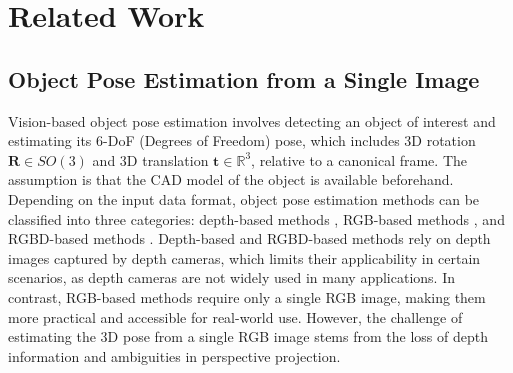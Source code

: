\section{Related Work}
\label{sec:Related}

\subsection{Object Pose Estimation from a Single Image}

Vision-based object pose estimation involves detecting an object of interest and estimating its 6-DoF (Degrees of Freedom) pose, which includes 3D rotation $\mathbf{R} \in SO(3)$ and 3D translation $\mathbf{t} \in \mathbb{R}^3$, relative to a canonical frame. The assumption is that the CAD model of the object is available beforehand. Depending on the input data format, object pose estimation methods can be classified into three categories: depth-based methods \cite{wang20216d, gao20206d, guo2021efficient}, RGB-based methods \cite{billings2019silhonet, peng2019pvnet, wang2021gdr}, and RGBD-based methods \cite{wang2019densefusion, he2020pvn3d, hong2024rdpn6d}. Depth-based and RGBD-based methods rely on depth images captured by depth cameras, which limits their applicability in certain scenarios, as depth cameras are not widely used in many applications. In contrast, RGB-based methods require only a single RGB image, making them more practical and accessible for real-world use. However, the challenge of estimating the 3D pose from a single RGB image stems from the loss of depth information and ambiguities in perspective projection.

